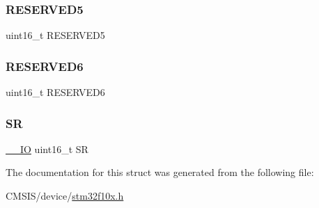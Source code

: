 \mbox{\label{struct_u_s_a_r_t___type_def_abd36010ac282682d1f3c641b183b1b6f}} 
\subsubsection{\texorpdfstring{RESERVED5}{RESERVED5}}
{\footnotesize\ttfamily uint16\+\_\+t R\+E\+S\+E\+R\+V\+E\+D5}

\mbox{\label{struct_u_s_a_r_t___type_def_aab502dde158ab7da8e7823d1f8a06edb}} 
\subsubsection{\texorpdfstring{RESERVED6}{RESERVED6}}
{\footnotesize\ttfamily uint16\+\_\+t R\+E\+S\+E\+R\+V\+E\+D6}

\mbox{\label{struct_u_s_a_r_t___type_def_a44962ea5442d203bf4954035d1bfeb9d}} 
\subsubsection{\texorpdfstring{SR}{SR}}
{\footnotesize\ttfamily \mbox{\hyperlink{core__sc300_8h_aec43007d9998a0a0e01faede4133d6be}{\+\_\+\+\_\+\+IO}} uint16\+\_\+t SR}



The documentation for this struct was generated from the following file\+:\begin{DoxyCompactItemize}
\item 
C\+M\+S\+I\+S/device/\mbox{\hyperlink{stm32f10x_8h}{stm32f10x.\+h}}\end{DoxyCompactItemize}
